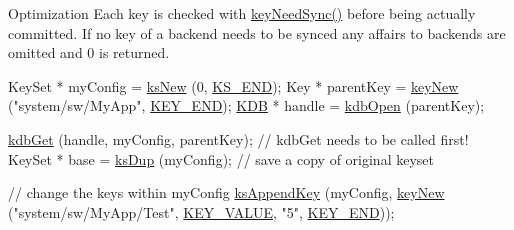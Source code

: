 \begin{DoxyParagraph}{Optimization}
Each key is checked with \hyperlink{group__keytest_gaf247df0de7aca04b32ef80e39ef12950}{key\+Need\+Sync()} before being actually committed. If no key of a backend needs to be synced any affairs to backends are omitted and 0 is returned.
\end{DoxyParagraph}

\begin{DoxyCodeInclude}
KeySet * myConfig = \hyperlink{group__keyset_ga671e1aaee3ae9dc13b4834a4ddbd2c3c}{ksNew} (0, \hyperlink{group__keyset_ga7a28fce3773b2c873c94ac80b8b4cd54}{KS\_END});
Key * parentKey = \hyperlink{group__key_gad23c65b44bf48d773759e1f9a4d43b89}{keyNew} (\textcolor{stringliteral}{"system/sw/MyApp"}, \hyperlink{group__key_gga9b703ca49f48b482def322b77d3e6bc8aa8adb6fcb92dec58fb19410eacfdd403}{KEY\_END});
\hyperlink{classkdb_1_1KDB_a7e0637995ce9f294cdbc6f167df6db40}{KDB} * handle = \hyperlink{group__kdb_ga6808defe5870f328dd17910aacbdc6ca}{kdbOpen} (parentKey);

\hyperlink{group__kdb_ga28e385fd9cb7ccfe0b2f1ed2f62453a1}{kdbGet} (handle, myConfig, parentKey); \textcolor{comment}{// kdbGet needs to be called first!}
KeySet * base = \hyperlink{group__keyset_gac59e4b328245463f1451f68d5106151c}{ksDup} (myConfig);     \textcolor{comment}{// save a copy of original keyset}

\textcolor{comment}{// change the keys within myConfig}
\hyperlink{group__keyset_gaa5a1d467a4d71041edce68ea7748ce45}{ksAppendKey} (myConfig, \hyperlink{group__key_gad23c65b44bf48d773759e1f9a4d43b89}{keyNew} (\textcolor{stringliteral}{"system/sw/MyApp/Test"}, 
      \hyperlink{group__key_gga9b703ca49f48b482def322b77d3e6bc8ac66e4a49d09212b79f5754ca6db5bd2e}{KEY\_VALUE}, \textcolor{stringliteral}{"5"}, \hyperlink{group__key_gga9b703ca49f48b482def322b77d3e6bc8aa8adb6fcb92dec58fb19410eacfdd403}{KEY\_END}));


\end{DoxyCodeInclude}
